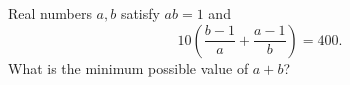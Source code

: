 Real numbers $a,b$ satisfy $ab=1$ and
\[
10\left(\dfrac{b-1}{a}+\dfrac{a-1}{b}\right)=400 .
\]
What is the minimum possible value of $a+b$?
